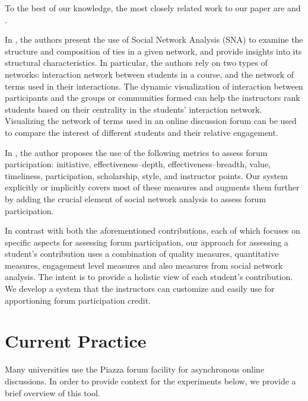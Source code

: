 To the best of our knowledge, the most closely related work to our paper are \cite{rabbany2014collaborative} and \cite{shaul2009assessing}.

In \cite{rabbany2014collaborative}, the authors present the use of Social Network Analysis (SNA) to examine the structure and composition of ties in a given network, and provide insights into its structural characteristics. In particular, the authors rely on two types of networks: interaction network between students in a course, and the network of terms used in their interactions. The dynamic visualization of interaction between participants and the groups or communities formed can help the instructors rank students based on their centrality in the students' interaction network. Visualizing the network of terms used in an online discussion forum can be used to compare the interest of different students and their relative engagement. 


In \cite{shaul2009assessing}, the author proposes the use of the
following metrics to assess forum participation: initiative,
effectiveness--depth, effectiveness--breadth, value, timeliness,
participation, scholarship, style, and instructor points. Our system explicitly or implicitly covers most of these measures and augments them further by adding the crucial element of social network analysis to assess forum participation.

In contrast with both the aforementioned contributions, each of which
focuses on specific aspects for assessing forum participation, our
approach for assessing a student's contribution uses a combination of
quality measures, quantitative measures, engagement level measures and
also measures from social network analysis. The intent is to provide a holistic view of each student's contribution. We develop a system that the instructors can customize and easily use for apportioning forum participation credit.


\section{Current Practice}

Many universities use the Piazza forum facility \cite{Piazza} for asynchronous online discussions. In order to provide context for the experiments below, we provide a brief overview of this tool.

